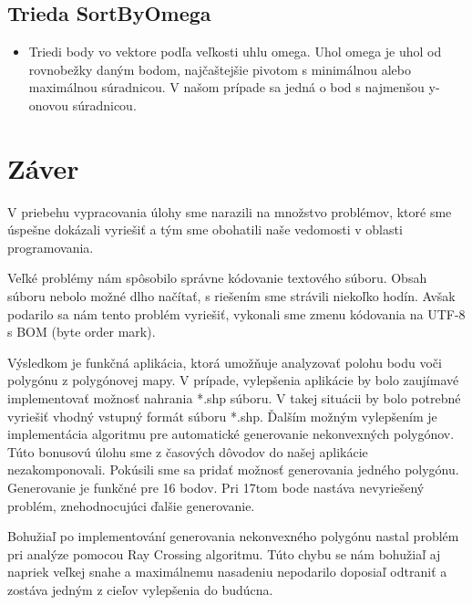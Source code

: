 \documentclass[12pt]{article}
\begin{document}
\subsection{Trieda SortByOmega}
\begin{itemize}
\item Triedi body vo vektore podľa veľkosti uhlu omega. Uhol omega je uhol od rovnobežky daným bodom, najčaštejšie pivotom s minimálnou alebo maximálnou súradnicou. V našom prípade sa jedná o bod s najmenšou y-onovou súradnicou.
\end{itemize}

\section{Záver}
V priebehu vypracovania úlohy sme narazili na množstvo problémov, ktoré sme úspešne dokázali vyriešiť a tým sme obohatili naše vedomosti v oblasti programovania.

Veľké problémy nám spôsobilo správne kódovanie textového súboru. Obsah súboru nebolo možné dlho načítať, s riešením sme strávili niekoľko hodín. Avšak podarilo sa nám tento problém vyriešiť, vykonali sme zmenu kódovania na UTF-8 s BOM (byte order mark).

Výsledkom je funkčná aplikácia, ktorá umožňuje analyzovať polohu bodu voči polygónu z polygónovej mapy. V prípade, vylepšenia aplikácie by bolo zaujímavé implementovať možnosť nahrania *.shp súboru. V takej situácii by bolo potrebné vyriešiť vhodný vstupný formát súboru *.shp. Ďalším možným vylepšením je implementácia algoritmu pre automatické generovanie nekonvexných polygónov. Túto bonusovú úlohu sme z časových dôvodov do našej aplikácie nezakomponovali. Pokúsili sme sa pridať možnosť generovania jedného polygónu. Generovanie je funkčné pre 16 bodov. Pri 17tom bode nastáva nevyriešený problém, znehodnocujúci ďalšie generovanie.

Bohužiaľ po implementování generovania nekonvexného polygónu nastal problém pri analýze pomocou Ray Crossing algoritmu. Túto chybu se nám bohužiaľ aj napriek veľkej snahe a maximálnemu nasadeniu nepodarilo doposiaľ odtraniť a zostáva jedným z cieľov vylepšenia do budúcna.

\nocite{*}

{}
    
\end{document}
